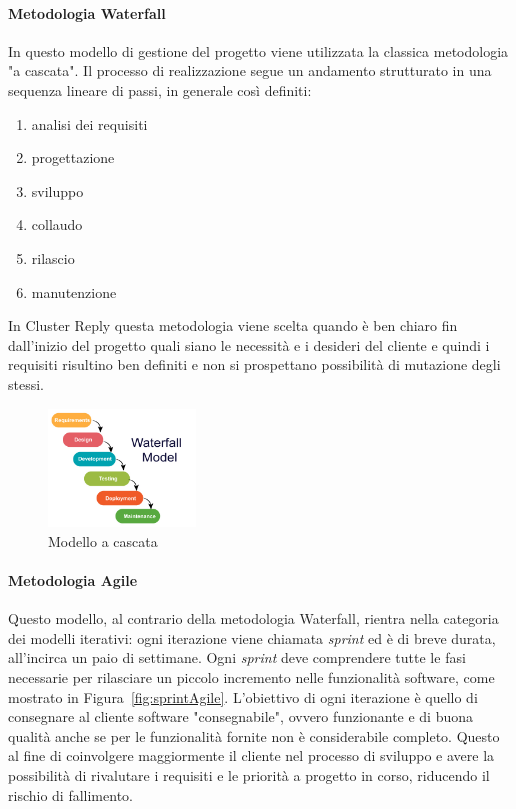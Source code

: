 \paragraph{Metodologia Waterfall} In questo modello di gestione del progetto viene utilizzata la classica metodologia "a cascata". Il processo di realizzazione segue un andamento strutturato in una sequenza lineare di passi, in generale così definiti:
\begin{enumerate}
  \item analisi dei requisiti
  \item progettazione
  \item sviluppo
  \item collaudo
  \item rilascio
  \item manutenzione
\end{enumerate}
In Cluster Reply questa metodologia viene scelta quando è ben chiaro fin dall'inizio del progetto quali siano le necessità e i desideri del cliente e quindi i requisiti risultino ben definiti e non si prospettano possibilità di mutazione degli stessi.
\begin{figure}[ht]
  \centering
  \includegraphics[width=0.35\textwidth]{waterfall-model.png}
  \caption{Modello a cascata}
  \label{fig:waterfallModel}
\end{figure}

\paragraph{Metodologia Agile} Questo modello, al contrario della metodologia Waterfall, rientra nella categoria dei modelli iterativi: ogni iterazione viene chiamata \textit{sprint} ed è di breve durata, all'incirca un paio di settimane. Ogni \textit{sprint} deve comprendere tutte le fasi necessarie per rilasciare un piccolo incremento nelle funzionalità software, come mostrato in Figura~\vref{fig:sprintAgile}. L'obiettivo di ogni iterazione è quello di consegnare al cliente software "consegnabile", ovvero funzionante e di buona qualità anche se per le funzionalità fornite non è considerabile completo. Questo al fine di coinvolgere maggiormente il cliente nel processo di sviluppo e avere la possibilità di rivalutare i requisiti e le priorità a progetto in corso, riducendo il rischio di fallimento. 

